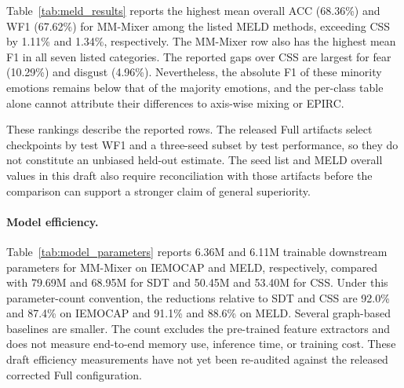 \documentclass[letterpaper]{article} %
\begin{document}
Table~\ref{tab:meld_results} reports the highest mean overall ACC (68.36\%) and WF1 (67.62\%) for MM-Mixer among the listed MELD methods, exceeding CSS by 1.11\% and 1.34\%, respectively. The MM-Mixer row also has the highest mean F1 in all seven listed categories. The reported gaps over CSS are largest for fear (10.29\%) and disgust (4.96\%). Nevertheless, the absolute F1 of these minority emotions remains below that of the majority emotions, and the per-class table alone cannot attribute their differences to axis-wise mixing or EPIRC.

These rankings describe the reported rows. The released Full artifacts select checkpoints by test WF1 and a three-seed subset by test performance, so they do not constitute an unbiased held-out estimate. The seed list and MELD overall values in this draft also require reconciliation with those artifacts before the comparison can support a stronger claim of general superiority.

\paragraph{Model efficiency.}
Table~\ref{tab:model_parameters} reports 6.36M and 6.11M trainable downstream parameters for MM-Mixer on IEMOCAP and MELD, respectively, compared with 79.69M and 68.95M for SDT and 50.45M and 53.40M for CSS. Under this parameter-count convention, the reductions relative to SDT and CSS are 92.0\% and 87.4\% on IEMOCAP and 91.1\% and 88.6\% on MELD. Several graph-based baselines are smaller. The count excludes the pre-trained feature extractors and does not measure end-to-end memory use, inference time, or training cost. These draft efficiency measurements have not yet been re-audited against the released corrected Full configuration.
\end{document}
